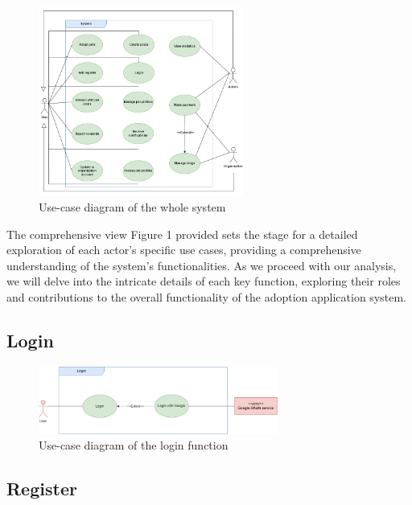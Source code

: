 \begin{figure}[H]
  \centering
  \includegraphics[width=0.6\textwidth]{Figures/system_ucd.png}
  \caption{Use-case diagram of the whole system}
  \label{fig:whole-system_activity_diagram}
\end{figure}

The comprehensive view Figure 1 provided sets the stage for a detailed exploration of each actor's specific use cases, providing a comprehensive understanding of the system's functionalities. As we proceed with our analysis, we will delve into the intricate details of each key function, exploring their roles and contributions to the overall functionality of the adoption application system.

\subsection{Login}

\begin{figure}[H]
  \centering
  \includegraphics[width=0.7\textwidth]{Figures/login_ucd.png}
  \caption{Use-case diagram of the login function}
  \label{fig:login_activity_diagram}
\end{figure}



\subsection{Register}


